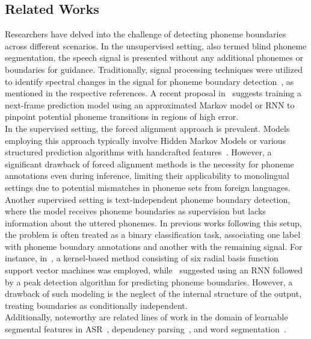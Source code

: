 \documentclass{article}
\begin{document}
\subsection{Related Works}
\begin{sloppypar}
    Researchers have delved into the challenge of detecting phoneme boundaries across different scenarios. In the unsupervised setting, also termed blind phoneme segmentation, the speech signal is presented without any additional phonemes or boundaries for guidance. Traditionally, signal processing techniques were utilized to identify spectral changes in the signal for phoneme boundary detection~\cite{dusan2006relation, estevan2007finding, hoang2015blind, almpanidis2008phonemic, rasanen2011blind}, as mentioned in the respective references. A recent proposal in~\cite{michel2016blind} suggests training a next-frame prediction model using an approximated Markov model or RNN to pinpoint potential phoneme transitions in regions of high error.\\[5mm]
    In the supervised setting, the forced alignment approach is prevalent. Models employing this approach typically involve Hidden Markov Models or various structured prediction algorithms with handcrafted features~\cite{keshet2005phoneme, mcauliffe2017montreal}. However, a significant drawback of forced alignment methods is the necessity for phoneme annotations even during inference, limiting their applicability to monolingual settings due to potential mismatches in phoneme sets from foreign languages.\\[5mm]
    Another supervised setting is text-independent phoneme boundary detection, where the model receives phoneme boundaries as supervision but lacks information about the uttered phonemes. In previous works following this setup, the problem is often treated as a binary classification task, associating one label with phoneme boundary annotations and another with the remaining signal. For instance, in~\cite{king2013accurate}, a kernel-based method consisting of six radial basis function support vector machines was employed, while~\cite{franke2016phoneme} suggested using an RNN followed by a peak detection algorithm for predicting phoneme boundaries. However, a drawback of such modeling is the neglect of the internal structure of the output, treating boundaries as conditionally independent.\\[5mm]
    Additionally, noteworthy are related lines of work in the domain of learnable segmental features in ASR~\cite{lu2016segmental}, dependency parsing~\cite{kiperwasser2016simple}, and word segmentation~\cite{adi2017sequence}.
\end{sloppypar}
\end{document}
